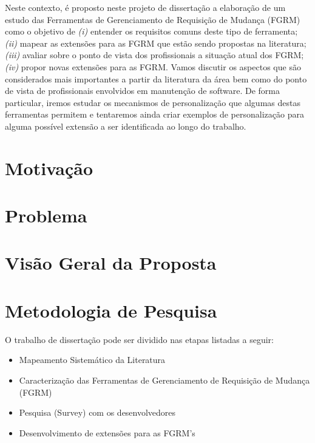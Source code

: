 \documentclass[msc]{ppgccufmg} %
\begin{document}
Neste contexto, é proposto neste projeto de dissertação a elaboração de um estudo das Ferramentas de Gerenciamento de Requisição de Mudança (FGRM) como o objetivo de \textit{(i)} entender os requisitos comuns deste tipo de ferramenta; \textit{(ii)} mapear as extensões para as FGRM que estão sendo propostas na literatura; \textit{(iii)} avaliar sobre o ponto de vista dos profissionais a situação atual dos FGRM; \textit{(iv)} propor novas extensões para as FGRM. Vamos discutir os aspectos que são
considerados mais importantes a partir da literatura da área bem como do ponto de vista de profissionais envolvidos em manutenção de software. De forma particular, iremos estudar os mecanismos de personalização que algumas destas ferramentas permitem e tentaremos ainda criar exemplos de personalização para alguma possível extensão a ser identificada ao longo do trabalho.

\section{Motivação}
\label{sec:intro-motivacao}

\section{Problema}
\label{sec:intro-problema}

\section{Visão Geral da Proposta}
\label{sec:intro-visao-geral}

\section{Metodologia de Pesquisa}
\label{sec:intro-metodologia}

O trabalho de dissertação pode ser dividido nas etapas listadas a seguir:

\begin{itemize}[(i)]
	\item Mapeamento Sistemático da Literatura \cite{keele2007guidelines}
	\item Caracterização das Ferramentas de Gerenciamento de Requisição de Mudança (FGRM)
	\item Pesquisa (Survey) com os desenvolvedores \cite{wohlin2012experimentation}
	\item Desenvolvimento de extensões para as FGRM's
\end{itemize}
\end{document}
